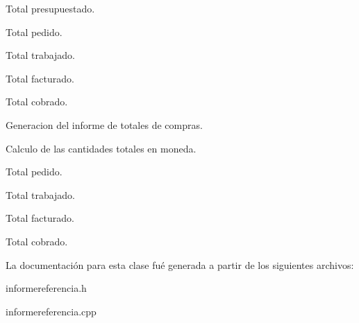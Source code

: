 Total presupuestado.

Total pedido.

Total trabajado.

Total facturado.

Total cobrado.

Generacion del informe de totales de compras.

Calculo de las cantidades totales en moneda.

Total pedido.

Total trabajado.

Total facturado.

Total cobrado. 

La documentaci\'{o}n para esta clase fu\'{e} generada a partir de los siguientes archivos:\begin{CompactItemize}
\item 
informereferencia.h\item 
informereferencia.cpp\end{CompactItemize}

